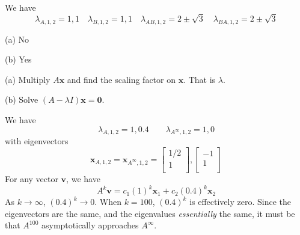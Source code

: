 \documentclass[a4paper]{article}
\begin{document}
We have
\[
	\lambda_{A,1,2} = 1, 1 \quad \lambda_{B,1,2} = 1, 1 \quad \lambda_{AB, 1, 2} = 2 \pm \sqrt{3} \quad \lambda_{BA, 1, 2} = 2 \pm \sqrt{3}
\]
\par (a) No

(b) Yes

\vspace{12pt}


(a) Multiply \(A \bm{x}\) and find the scaling factor on \(\bm{x}\). That is \(\lambda \).

\par (b) Solve \(\!\left( A - \lambda I \right) \bm{x} = \bm{0}\).

\vspace{12pt}


We have
\[
	\lambda_{A,1,2} = 1, 0.4 \qquad \lambda_{A^{\infty}, 1, 2} = 1, 0
\]
with eigenvectors
\[
	\bm{x}_{A,1,2} = \bm{x}_{A^{\infty},1,2} = 
	\begin{bmatrix}
		1/2 \\
		1 \\
	\end{bmatrix},
	\begin{bmatrix}
		-1 \\
		1 \\
	\end{bmatrix}
\]
For any vector \(\bm{v}\), we have
\[
	A^{k} \bm{v} = c_{1} \!\left( 1 \right)^{k} \bm{x}_{1} + c_{2} \!\left( 0.4 \right)^{k} \bm{x}_{2}
\]
As \(k \rightarrow \infty\), \(\!\left( 0.4 \right)^{k} \rightarrow 0\). When \(k = 100\), \(\!\left( 0.4 \right)^{k}\) is effectively zero. Since the eigenvectors are the same, and the eigenvalues \textit{essentially} the same, it must be that \(A^{100}\) asymptotically approaches \(A^{\infty}\).
\end{document}
